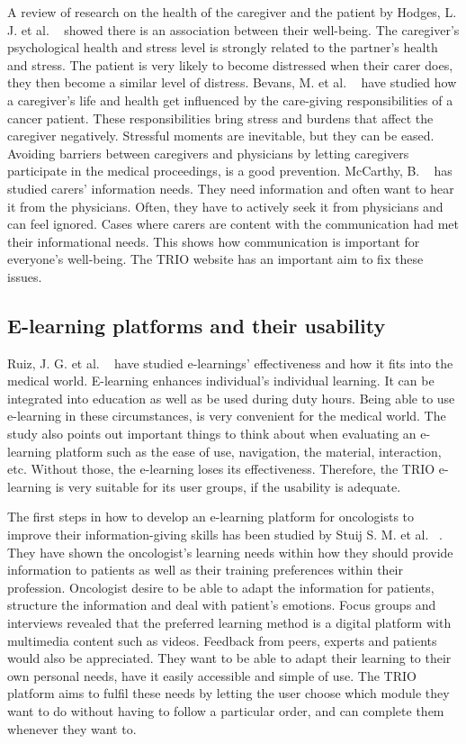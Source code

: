 \documentclass{sigchi}
\begin{document}
A review of research on the health of the caregiver and the patient by Hodges, L. J. et al. ~\cite{Hodges2005} showed there is an association between their well-being. The caregiver’s psychological health and stress level is strongly related to the partner’s health and stress. The patient is very likely to become distressed when their carer does, they then become a similar level of distress. Bevans, M. et al. ~\cite{Bevans2012} have studied how a caregiver’s life and health get influenced by the care-giving responsibilities of a cancer patient. These responsibilities bring stress and burdens that affect the caregiver negatively. Stressful moments are inevitable, but they can be eased. Avoiding barriers between caregivers and physicians by letting caregivers participate in the medical proceedings, is a good prevention. McCarthy, B. ~\cite{McCarthy2011} has studied carers’ information needs. They need information and often want to hear it from the physicians. Often, they have to actively seek it from physicians and can feel ignored. Cases where carers are content with the communication had met their informational needs. This shows how communication is important for everyone’s well-being. The TRIO website has an important aim to fix these issues.  

\subsection{E-learning platforms and their usability}

Ruiz, J. G. et al. ~\cite{Ruiz2006} have studied e-learnings’ effectiveness and how it fits into the medical world. E-learning enhances individual’s individual learning. It can be integrated into education as well as be used during duty hours. Being able to use e-learning in these circumstances, is very convenient for the medical world. The study also points out important things to think about when evaluating an e-learning platform such as the ease of use, navigation, the material, interaction, etc. Without those, the e-learning loses its effectiveness. Therefore, the TRIO e-learning is very suitable for its user groups, if the usability is adequate. 

The first steps in how to develop an e-learning platform for oncologists to improve their information-giving skills has been studied by Stuij S. M. et al. ~\cite{Stuij2018}. They have shown the oncologist’s learning needs within how they should provide information to patients as well as their training preferences within their profession. Oncologist desire to be able to adapt the information for patients, structure the information and deal with patient’s emotions. Focus groups and interviews revealed that the preferred learning method is a digital platform with multimedia content such as videos. Feedback from peers, experts and patients would also be appreciated. They want to be able to adapt their learning to their own personal needs, have it easily accessible and simple of use. The TRIO platform aims to fulfil these needs by letting the user choose which module they want to do without having to follow a particular order, and can complete them whenever they want to. 
\end{document}
